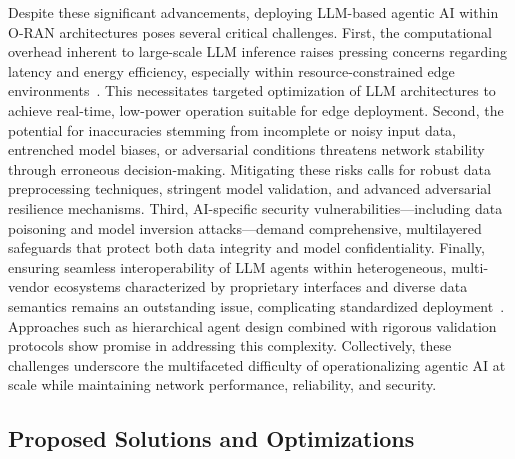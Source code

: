 \documentclass[sigconf]{acmart}
\begin{document}
Despite these significant advancements, deploying LLM-based agentic AI within O-RAN architectures poses several critical challenges. First, the computational overhead inherent to large-scale LLM inference raises pressing concerns regarding latency and energy efficiency, especially within resource-constrained edge environments~\cite{ref55,ref48}. This necessitates targeted optimization of LLM architectures to achieve real-time, low-power operation suitable for edge deployment. Second, the potential for inaccuracies stemming from incomplete or noisy input data, entrenched model biases, or adversarial conditions threatens network stability through erroneous decision-making. Mitigating these risks calls for robust data preprocessing techniques, stringent model validation, and advanced adversarial resilience mechanisms. Third, AI-specific security vulnerabilities—including data poisoning and model inversion attacks—demand comprehensive, multilayered safeguards that protect both data integrity and model confidentiality. Finally, ensuring seamless interoperability of LLM agents within heterogeneous, multi-vendor ecosystems characterized by proprietary interfaces and diverse data semantics remains an outstanding issue, complicating standardized deployment~\cite{ref55,ref48}. Approaches such as hierarchical agent design combined with rigorous validation protocols show promise in addressing this complexity. Collectively, these challenges underscore the multifaceted difficulty of operationalizing agentic AI at scale while maintaining network performance, reliability, and security.

\subsection{Proposed Solutions and Optimizations}
\end{document}
